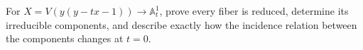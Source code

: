 \begin{problem}\label{chall:vi25-01}
For $X=V(y(y-tx-1))\to\mathbb A^1_t$, prove every fiber is reduced, determine its irreducible components, and describe exactly how the incidence relation between the components changes at $t=0$.
\end{problem}
